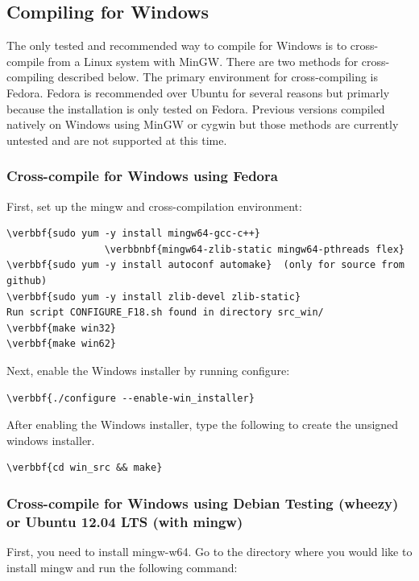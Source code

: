 \documentclass[11pt,fleqn]{article} %
\begin{document}
\subsection{Compiling for Windows}
The only tested and recommended way to compile for Windows is to cross-compile from a Linux system with MinGW. There are two methods for cross-compiling described below. The primary environment for cross-compiling is Fedora. Fedora is recommended over Ubuntu for several reasons but primarly because the installation is only tested on Fedora. Previous versions compiled natively on Windows using MinGW or cygwin but those methods are currently untested and are not supported at this time.

\subsubsection{Cross-compile for Windows using Fedora}
First, set up the mingw and cross-compilation environment:
\begin{Verbatim}[commandchars=\\\{\}] 
\verbbf{sudo yum -y install mingw64-gcc-c++} 
		         \verbbnbf{mingw64-zlib-static mingw64-pthreads flex}
\verbbf{sudo yum -y install autoconf automake}  (only for source from github)
\verbbf{sudo yum -y install zlib-devel zlib-static}
Run script CONFIGURE_F18.sh found in directory src_win/
\verbbf{make win32}
\verbbf{make win62}
\end{Verbatim}

Next, enable the Windows installer by running configure: 
\begin{Verbatim}[commandchars=\\\{\}] 
\verbbf{./configure --enable-win_installer}
\end{Verbatim}
After enabling the Windows installer, type the following to create the unsigned windows installer. 

\begin{Verbatim}[commandchars=\\\{\}] 
\verbbf{cd win_src && make}
\end{Verbatim}


\subsubsection{Cross-compile for Windows using Debian Testing (wheezy) or Ubuntu 12.04 LTS (with mingw)}
First, you need to install mingw-w64. Go to the directory where you would like to install mingw and run the following command:
\end{document}
